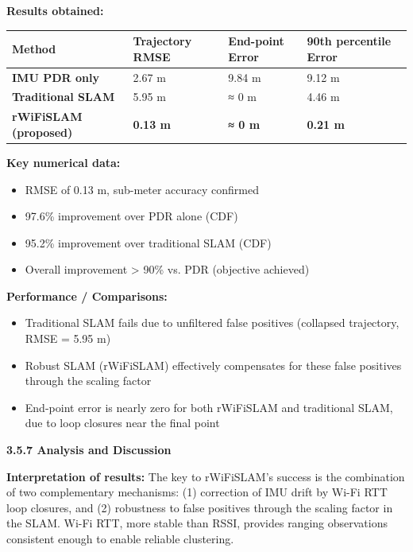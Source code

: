 \documentclass{ipgpmaster}
\begin{document}
\textbf{Results obtained:}

\begin{table}
\centering

\begin{tabular}{l l l l}
\textbf{Method} & \textbf{Trajectory RMSE} & \textbf{End-point Error} & \textbf{90th percentile Error} \\
\hline
\textbf{IMU PDR only} & 2.67 m & 9.84 m & 9.12 m \\
\hline
\textbf{Traditional SLAM} & 5.95 m & ≈ 0 m & 4.46 m \\
\hline
\textbf{rWiFiSLAM (proposed)} & \textbf{0.13 m} & \textbf{≈ 0 m} & \textbf{0.21 m} \\
\hline

\end{tabular}

\end{table}

\textbf{Key numerical data:}

\begin{itemize}
    \item RMSE of 0.13 m,  sub-meter accuracy confirmed
    \item 97.6\% improvement over PDR alone (CDF)
    \item 95.2\% improvement over traditional SLAM (CDF)
    \item Overall improvement > 90\% vs. PDR (objective achieved)
\end{itemize}
\textbf{Performance / Comparisons:}

\begin{itemize}
    \item Traditional SLAM fails due to unfiltered false positives (collapsed trajectory, RMSE = 5.95 m)
    \item Robust SLAM (rWiFiSLAM) effectively compensates for these false positives through the scaling factor
    \item End-point error is nearly zero for both rWiFiSLAM and traditional SLAM, due to loop closures near the final point


\end{itemize}
 \textbf{3.5.7   Analysis and Discussion}

\textbf{Interpretation of results:} The key to rWiFiSLAM's success is the combination of two complementary mechanisms: (1) correction of IMU drift by Wi-Fi RTT loop closures, and (2) robustness to false positives through the scaling factor in the SLAM. Wi-Fi RTT, more stable than RSSI, provides ranging observations consistent enough to enable reliable clustering.
\end{document}

